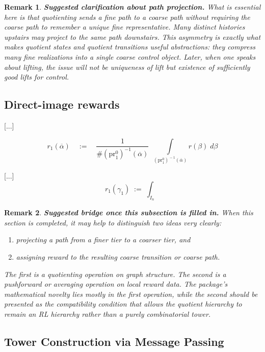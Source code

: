 \documentclass[11pt]{article}
\newtheorem{remark}{Remark}[subsection]
\begin{document}
{\color{blue}
\begin{remark}
{\bf Suggested clarification about path projection.}
\normalfont
What is essential here is that quotienting sends a fine path to a coarse path without requiring the coarse path to remember a unique fine representative. Many distinct histories upstairs may project to the same path downstairs. This asymmetry is exactly what makes quotient states and quotient transitions useful abstractions: they compress many fine realizations into a single coarse control object. Later, when one speaks about lifting, the issue will not be uniqueness of lift but existence of sufficiently good lifts for control.
\end{remark}
}

\subsection{Direct-image rewards}
[...]

$$
r_{1}(\overline{\alpha})
\quad\!\!:=\quad
\frac{1}{\# (\text{pr}^{0}_{1})^{-1}(\overline{\alpha})}
\ \ 
\underset{\!\!\!\!{(\text{pr}^{0}_{1})}^{\!-1\!}(\overline{\alpha})}{\int}\!\!\!\! r(\beta)\;d\beta
$$


[...]
$$
r_{1}(\gamma_{1})\;:=\;
\int_{I_{n}}
$$

{\color{blue}
\begin{remark}
{\bf Suggested bridge once this subsection is filled in.}
\normalfont
When this section is completed, it may help to distinguish two ideas very clearly:
\begin{enumerate}
\item
projecting a path from a finer tier to a coarser tier, and
\item
assigning reward to the resulting coarse transition or coarse path.
\end{enumerate}
The first is a quotienting operation on graph structure. The second is a pushforward or averaging operation on local reward data. The package's mathematical novelty lies mostly in the first operation, while the second should be presented as the compatibility condition that allows the quotient hierarchy to remain an RL hierarchy rather than a purely combinatorial tower.
\end{remark}
}

\subsection{Tower Construction via Message Passing}
\end{document}
